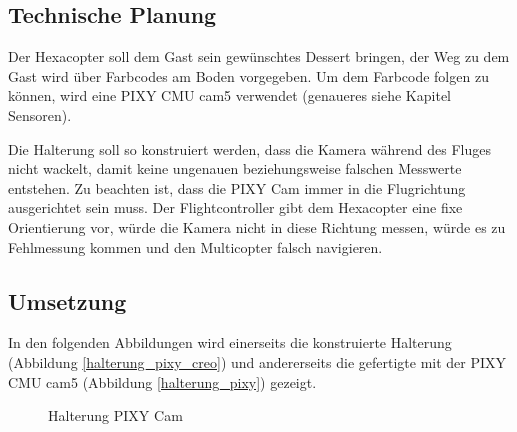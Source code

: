 	\subsection{Technische Planung}

	Der Hexacopter soll dem Gast sein gewünschtes Dessert bringen, der Weg zu dem Gast wird über Farbcodes am Boden vorgegeben.
	Um dem Farbcode folgen zu können, wird eine PIXY CMU cam5 verwendet (genaueres siehe Kapitel Sensoren).

	Die Halterung soll so konstruiert werden, dass die Kamera während des Fluges nicht wackelt, damit keine ungenauen beziehungsweise falschen Messwerte entstehen.
	Zu beachten ist, dass die PIXY Cam immer in die Flugrichtung ausgerichtet sein muss.
	Der Flightcontroller gibt dem Hexacopter eine fixe Orientierung vor, würde die Kamera nicht in diese Richtung messen, würde es zu Fehlmessung kommen und den Multicopter falsch navigieren.

	\subsection{Umsetzung}

	In den folgenden Abbildungen wird einerseits die konstruierte Halterung (Abbildung \ref{halterung_pixy_creo})
	und andererseits die gefertigte  mit der PIXY CMU cam5 (Abbildung \ref{halterung_pixy}) gezeigt.

			\begin{figure}[thb]
				\begin{centering}
				\par\end{centering}
				\caption{Halterung PIXY Cam}
				\label{Halterung_PIXY}
			\end{figure}


